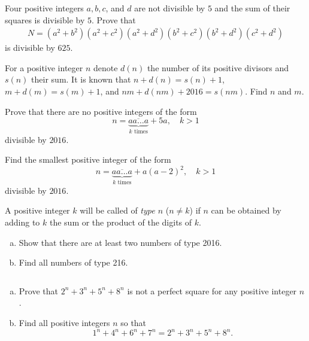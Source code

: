 \documentclass[problems.tex]{subfile}
\begin{document}
	\begin{problem}
		Four positive integers $a, b, c$, and $d$ are not divisible by $5$ and the sum of their squares is divisible by $5$. Prove that
		\begin{align*}
			N = (a^2 + b^2)(a^2 + c^2)(a^2 + d^2)(b^2 + c^2)(b^2 + d^2)(c^2 + d^2)
		\end{align*}
		is divisible by $625$.
	\end{problem}



	\begin{problem}
		For a positive integer $n$ denote $d(n)$ the number of its positive divisors and $s(n)$ their sum. It is known that $n + d(n) = s(n) + 1$, $m + d(m) = s(m) + 1$, and $nm + d(nm) + 2016 = s(nm)$. Find $n$ and $m$.
	\end{problem}



	\begin{problem}
		Prove that there are no positive integers of the form $$n = \underbrace{\overline{aa\dots a}}_{k\text{ times}} + 5a , \quad k >1$$ divisible by $2016$.
	\end{problem}



	\begin{problem}
		Find the smallest positive integer of the form $$n = \underbrace{\overline{aa\dots a}}_{k\text{ times}} + a(a-2)^2 , \quad k >1$$ divisible by $2016$.
	\end{problem}


	\begin{problem}
		A positive integer $k$ will be called of \textit{type $n$} ($n \neq k$) if $n$ can be obtained by adding to $k$ the sum or the product of the digits of $k$.
		\begin{enumerate}[(a)]
			\item Show that there are at least two numbers of type 2016.
			\item  Find all numbers of type 216.
		\end{enumerate}
	\end{problem}


	\begin{problem}
		$ $
		\begin{enumerate}[(a)]
			\item Prove that $2^n+3^n+5^n+8^n$ is not a perfect square for any positive integer $n$.
			\item Find all positive integers $n$ so that $$1^n + 4^n + 6^n + 7^n = 2^n + 3^n + 5^n + 8^n.$$
		\end{enumerate}
	\end{problem}
\end{document}
